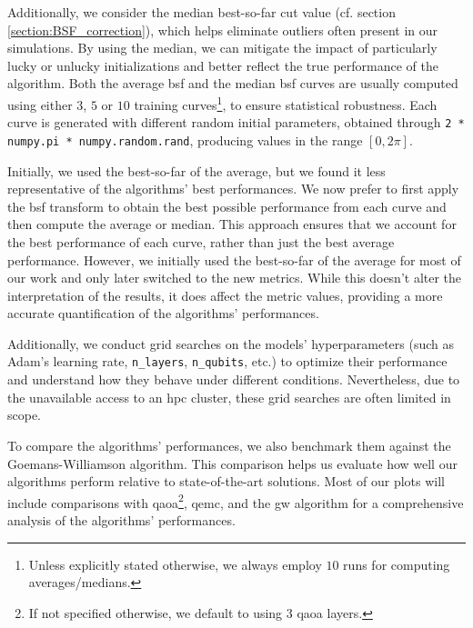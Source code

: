 Additionally, we consider the median best-so-far cut value (cf. section \ref{section:BSF_correction}), which helps eliminate outliers often present in our simulations. By using the median, we can mitigate the impact of particularly lucky or unlucky initializations and better reflect the true performance of the algorithm. Both the average \acrshort{bsf} and the median \acrshort{bsf} curves are usually computed using either $3$, $5$ or $10$ training curves\footnote{Unless explicitly stated otherwise, we always employ $10$ runs for computing averages/medians.}, to ensure statistical robustness. Each curve is generated with different random initial parameters, obtained through \texttt{2 * numpy.pi * numpy.random.rand}, producing values in the range $[0,2\pi]$.

Initially, we used the best-so-far of the average, but we found it less representative of the algorithms' best performances. We now prefer to first apply the \acrshort{bsf} transform to obtain the best possible performance from each curve and then compute the average or median. This approach ensures that we account for the best performance of each curve, rather than just the best average performance. However, we initially used the best-so-far of the average for most of our work and only later switched to the new metrics. While this doesn't alter the interpretation of the results, it does affect the metric values, providing a more accurate quantification of the algorithms' performances.

Additionally, we conduct grid searches on the models' hyperparameters (such as Adam's learning rate, \texttt{n\_layers}, \texttt{n\_qubits}, etc.) to optimize their performance and understand how they behave under different conditions. Nevertheless, due to the unavailable access to an \acrshort{hpc} cluster, these grid searches are often limited in scope.

To compare the algorithms' performances, we also benchmark them against the Goemans-Williamson algorithm. This comparison helps us evaluate how well our algorithms perform relative to state-of-the-art solutions. Most of our plots will include comparisons with \acrshort{qaoa}\footnote{If not specified otherwise, we default to using $3$ \acrshort{qaoa} layers.}, \acrshort{qemc}, and the \acrshort{gw} algorithm for a comprehensive analysis of the algorithms' performances.
